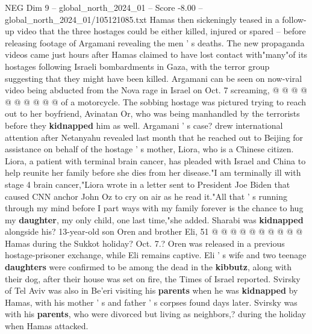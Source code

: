 \begin{textsample}{NEG Dim 9 – global\_north\_2024\_01 – Score -8.00 – global\_north\_2024\_01/105121085.txt}
Hamas then sickeningly teased in a follow-up video that the three hostages could be either killed, injured or spared -- before releasing footage of Argamani revealing the men ' s deaths.
The new propaganda videos came just hours after Hamas claimed to have lost contact with"many"of its hostages following Israeli bombardments in Gaza, with the terror group suggesting that they might have been killed.
Argamani can be seen on now-viral video being abducted from the Nova rage in Israel on Oct. 7 screaming, @ @ @ @ @ @ @ @ @ @ of a motorcycle.
The sobbing hostage was pictured trying to reach out to her boyfriend, Avinatan Or, who was being manhandled by the terrorists before they \textbf{kidnapped} him as well.
Argamani ' s case? drew international attention after Netanyahu revealed last month that he reached out to Beijing for assistance on behalf of the hostage ' s mother, Liora, who is a Chinese citizen.
Liora, a patient with terminal brain cancer, has pleaded with Israel and China to help reunite her family before she dies from her disease."I am terminally ill with stage 4 brain cancer,"Liora wrote in a letter sent to President Joe Biden that caused CNN anchor John Oz to cry on air as he read it."All that ' s running through my mind before I part ways with my family forever is the chance to hug my \textbf{daughter}, my only child, one last time,"she added.
Sharabi was \textbf{kidnapped} alongside his? 13-year-old son Oren and brother Eli, 51 @ @ @ @ @ @ @ @ @ @ Hamas during the Sukkot holiday?
Oct. 7.?
Oren was released in a previous hostage-prisoner exchange, while Eli remains captive.
Eli ' s wife and two teenage \textbf{daughters} were confirmed to be among the dead in the \textbf{kibbutz}, along with their dog, after their house was set on fire, the Times of Israel reported.
Svirsky of Tel Aviv was also in Be'eri visiting his \textbf{parents} when he was \textbf{kidnapped} by Hamas, with his mother ' s and father ' s corpses found days later.
Svirsky was with his \textbf{parents}, who were divorced but living as neighbors,? during the holiday when Hamas attacked.

\end{textsample}
